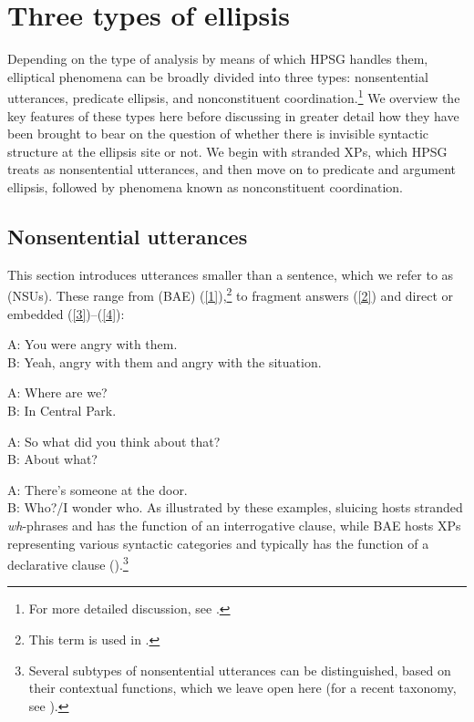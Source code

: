 {%


\section{Three types of ellipsis}
\label{sec-three-types-of-ellipsis}

Depending on the type of analysis by means of which HPSG handles them, elliptical phenomena can be broadly divided into three types:
         nonsentential utterances, predicate ellipsis, and nonconstituent coordination.\footnote{For more detailed discussion, see \citet{Kim2020}.}
          We overview the key features of these types here before discussing in greater detail how they have been brought to bear on the question of whether there is invisible syntactic structure at the ellipsis site or not. We begin with stranded XPs, which HPSG treats as nonsentential utterances, and then move on to predicate and argument ellipsis, followed by phenomena known as nonconstituent coordination.


\subsection{Nonsentential utterances}
This section introduces utterances smaller than a sentence, which we refer to as \emph{} (NSUs). These range from \emph{} (BAE) (\ref{1}),\footnote{This term is used in \citet{CJ2005a}.} to fragment answers (\ref{2})
and direct or embedded  (\ref{3})--(\ref{4}):

\ea A: You were angry with them.\\ B: Yeah, angry with them and angry with the situation.\label{1}\z

\ea A: Where are we? \\B: In Central Park.\label{2}\z

\ea A: So what did you think about that?\\ B: About what? \label{3}\z

\ea A: There's someone at the door. \\B: Who?/I wonder who. \label{4}\z
%
As illustrated by these examples, sluicing hosts stranded \emph{wh}-phrases and has the function of an interrogative clause, while BAE hosts XPs representing various syntactic categories and typically has the function of a declarative clause (\citealt{Ginzburg:Sag:2000,CJ2005a}).\footnote{Several subtypes of nonsentential utterances can be distinguished, based on their contextual functions, which we leave open here (for a recent taxonomy, see \citealt[217]{Ginzburg2012}).}

}
